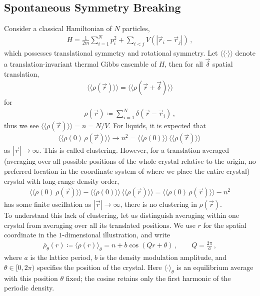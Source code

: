 \documentclass[11pt, oneside]{book}
\theoremstyle{break}
\theoremstyle{break}
\begin{document}

\newpage
\subsection{Spontaneous Symmetry Breaking}
Consider a classical Hamiltonian of $N$ particles, 
\begin{align*}
H = \frac{1}{2m}\sum_{i=1}^N p_i^2 + \sum_{i< j }V(|\vec{r}_i-\vec{r}_j|)\,,
\end{align*}
which possesses translational symmetry and rotational symmetry. Let $\langle\langle \cdot \rangle\rangle$ denote a translation-invariant thermal Gibbs ensemble of $H$, then for all $\vec{\delta}$ spatial translation, 
\begin{align*}
\langle\langle \rho(\vec{r}) \rangle\rangle = \langle\langle \rho(\vec{r}+\vec{\delta})\rangle\rangle
\end{align*}
for \begin{align*}
\rho(\vec{r})\coloneqq \sum_{i=1}^N \delta (\vec{r} - \vec{r}_i)\,,
\end{align*}
thus we see $\langle\langle \rho(\vec{r})\rangle\rangle = n = N/V$. For liquids, it is expected that 
\begin{align*}
\langle \langle \rho(0)\, \rho(\vec{r}) \rangle\rangle \to n^2 = \langle\langle \rho(0)\rangle\rangle\,\langle\langle \rho(\vec{r}) \rangle\rangle\,
\end{align*}
as $|\vec{r}|\to \infty$.
This is called clustering. However, for a translation-averaged (averaging over all possible positions of the whole crystal relative to the origin, no preferred location in the coordinate system of where we place the entire crystal) crystal with long-range density order, 
\begin{align*}
\langle \langle \rho(0) \,\rho(\vec{r}) \rangle\rangle - \langle \langle \rho(0) \rangle\rangle\, \langle\langle \rho(\vec{r}) \rangle\rangle = \langle \langle \rho(0) \,\rho(\vec{r}) \rangle\rangle - n^2
\end{align*}
has some finite oscillation as $|\vec{r}| \to \infty$, there is no clustering in $\rho(\vec{r})$. \\



To understand this lack of clustering, let us distinguish averaging within one crystal from averaging over all its translated positions. We use $r$ for the spatial coordinate in the $1$-dimensional illustration, and write
\begin{align*}
\overline{\rho}_\theta(r) \coloneqq \langle \rho(r)\rangle_\theta
= n+b\cos(Qr+\theta)\,,\qquad Q=\frac{2\pi}{a}\,,
\end{align*}
where $a$ is the lattice period, $b$ is the density modulation amplitude, and $\theta\in[0,2\pi)$ specifies the position of the crystal. Here $\langle\cdot\rangle_\theta$ is an equilibrium average with this position $\theta$ fixed; the cosine retains only the first harmonic of the periodic density.\\
\end{document}

